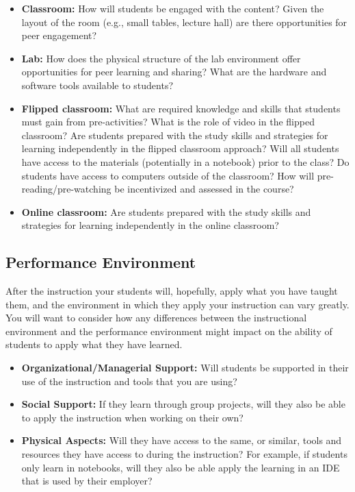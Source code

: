 \documentclass[]{book}
\providecommand{\tightlist}{%
  \setlength{\itemsep}{0pt}\setlength{\parskip}{0pt}}
\begin{document}
\begin{itemize}
\tightlist
\item
  \textbf{Classroom:} How will students be engaged with the content?
  Given the layout of the room (e.g., small tables, lecture hall) are
  there opportunities for peer engagement?
\item
  \textbf{Lab:} How does the physical structure of the lab environment
  offer opportunities for peer learning and sharing? What are the
  hardware and software tools available to students?
\item
  \textbf{Flipped classroom:} What are required knowledge and skills
  that students must gain from pre-activities? What is the role of video
  in the flipped classroom? Are students prepared with the study skills
  and strategies for learning independently in the flipped classroom
  approach? Will all students have access to the materials (potentially
  in a notebook) prior to the class? Do students have access to
  computers outside of the classroom? How will pre-reading/pre-watching
  be incentivized and assessed in the course?
\item
  \textbf{Online classroom:} Are students prepared with the study skills
  and strategies for learning independently in the online classroom?
\end{itemize}

\subsection{Performance Environment}\label{performance-environment}

After the instruction your students will, hopefully, apply what you have
taught them, and the environment in which they apply your instruction
can vary greatly. You will want to consider how any differences between
the instructional environment and the performance environment might
impact on the ability of students to apply what they have learned.

\begin{itemize}
\tightlist
\item
  \textbf{Organizational/Managerial Support:} Will students be supported
  in their use of the instruction and tools that you are using?
\item
  \textbf{Social Support:} If they learn through group projects, will
  they also be able to apply the instruction when working on their own?
\item
  \textbf{Physical Aspects:} Will they have access to the same, or
  similar, tools and resources they have access to during the
  instruction? For example, if students only learn in notebooks, will
  they also be able apply the learning in an IDE that is used by their
  employer?
\end{itemize}
\end{document}

